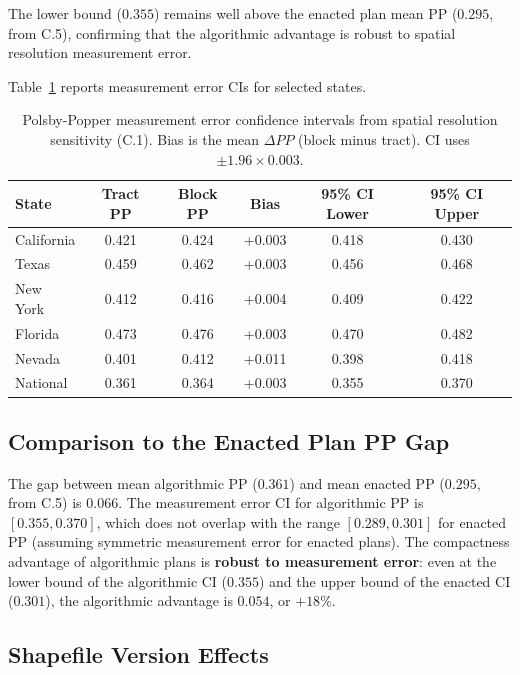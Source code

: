 The lower bound ($0.355$) remains well above the enacted plan mean PP
($0.295$, from C.5), confirming that the algorithmic advantage is
robust to spatial resolution measurement error.

Table~\ref{tab:pp-resolution-ci} reports measurement error CIs for
selected states.

\begin{table}[htb]
\centering
\caption{Polsby-Popper measurement error confidence intervals from
  spatial resolution sensitivity (C.1). Bias is the mean $\Delta PP$
  (block minus tract). CI uses $\pm 1.96 \times 0.003$.}
\label{tab:pp-resolution-ci}
\small
\begin{tabular}{lccccc}
\toprule
State & Tract PP & Block PP & Bias & 95\% CI Lower & 95\% CI Upper \\
\midrule
California  & 0.421 & 0.424 & +0.003 & 0.418 & 0.430 \\
Texas       & 0.459 & 0.462 & +0.003 & 0.456 & 0.468 \\
New York    & 0.412 & 0.416 & +0.004 & 0.409 & 0.422 \\
Florida     & 0.473 & 0.476 & +0.003 & 0.470 & 0.482 \\
Nevada      & 0.401 & 0.412 & +0.011 & 0.398 & 0.418 \\
\midrule
National    & 0.361 & 0.364 & +0.003 & 0.355 & 0.370 \\
\bottomrule
\end{tabular}
\end{table}

\subsection{Comparison to the Enacted Plan PP Gap}

The gap between mean algorithmic PP ($0.361$) and mean enacted PP
($0.295$, from C.5) is $0.066$. The measurement error CI for
algorithmic PP is $[0.355, 0.370]$, which does not overlap with the
range $[0.289, 0.301]$ for enacted PP (assuming symmetric measurement
error for enacted plans). The compactness advantage of algorithmic
plans is \textbf{robust to measurement error}: even at the lower bound
of the algorithmic CI ($0.355$) and the upper bound of the enacted CI
($0.301$), the algorithmic advantage is $0.054$, or $+18\%$.

\subsection{Shapefile Version Effects}


